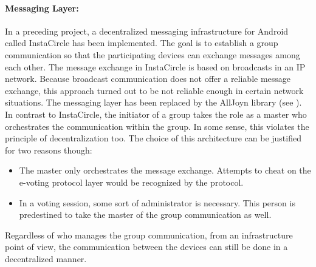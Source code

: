 \documentclass[numbers=noenddot, abstract=on, a4paper, headsepline,
footsepline, oneside, openright, draft=off, listof=leveldown]{scrreprt}
\newcommand{\myref}[1]{(see \Vref{#1})}
\begin{document}
\paragraph{Messaging Layer:} In a preceding project, a decentralized messaging
infrastructure for Android called InstaCircle \cite{ritter13a} has been
implemented. The goal is to establish a group communication so that the
participating devices can exchange messages among each other. The message
exchange in InstaCircle is based on broadcasts in an IP network.
Because broadcast communication does not offer a reliable message exchange, this
approach turned out to be not reliable enough in certain network situations. The
messaging layer has been replaced by the AllJoyn library \myref{sec:alljoyn}.
In contrast to InstaCircle, the initiator of a group takes the role as a master
who orchestrates the communication within the group. In some sense, this
violates the principle of decentralization too. The choice of this architecture
can be justified for two reasons though: 
\begin{itemize}
  \item The master only orchestrates the message exchange. Attempts to cheat on
  the e-voting protocol layer would be recognized by the protocol.
  \item In a voting session, some sort of administrator is necessary. This
  person is predestined to take the master of the group communication as well.
\end{itemize}
Regardless of who manages the group communication, from an infrastructure point
of view, the communication between the devices can still be done in a
decentralized manner.
\end{document}
